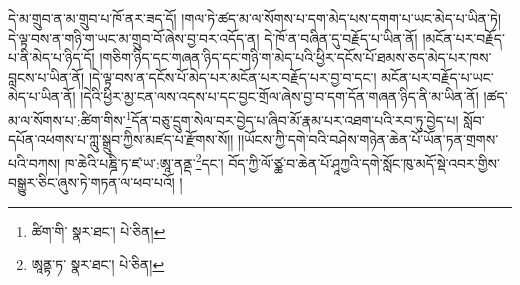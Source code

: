 དེ་མ་གྲུབ་ན་མ་གྲུབ་པ་ཁོ་ནར་ཟད་དོ། །གལ་ཏེ་ཚད་མ་ལ་སོགས་པ་དག་མེད་པས་དགག་པ་ཡང་མེད་པ་ཡིན་ཏེ། དེ་ལྟ་བས་ན་གཉི་ག་ཡང་མ་གྲུབ་བོ་ཞེས་བྱ་བར་འདོད་ན། དེ་ཁོ་ན་བཞིན་དུ་བརྗོད་པ་ཡིན་ནོ། །མངོན་པར་བརྗོད་པ་ནི་མེད་པ་ཉིད་དོ། །གཅིག་ཉིད་དང་གཞན་ཉིད་དང་གཉི་ག་མེད་པའི་ཕྱིར་དངོས་པོ་ཐམས་ཅད་མེད་པར་ཁས་བླངས་པ་ཡིན་ནོ། །དེ་ལྟ་བས་ན་དངོས་པོ་མེད་པར་མངོན་པར་བརྗོད་པར་བྱ་བ་དང་། མངོན་པར་བརྗོད་པ་ཡང་མེད་པ་ཡིན་ནོ། །དེའི་ཕྱིར་མྱ་ངན་ལས་འདས་པ་དང་བྱང་གྲོལ་ཞེས་བྱ་བ་དག་དོན་གཞན་ཉིད་ནི་མ་ཡིན་ནོ། །ཚད་མ་ལ་སོགས་པ་:ཚིག་གིས་\footnote{ཚིག་གི་  སྣར་ཐང་།  པེ་ཅིན། }དོན་བཅུ་དྲུག་སེལ་བར་བྱེད་པ་ཞིབ་མོ་རྣམ་པར་འཐག་པའི་རབ་ཏུ་བྱེད་པ། སློབ་དཔོན་འཕགས་པ་ཀླུ་སྒྲུབ་ཀྱིས་མཛད་པ་རྫོགས་སོ།། །།ཡོངས་ཀྱི་དགེ་བའི་བཤེས་གཉེན་ཆེན་པོ་ཡོན་ཏན་གྲགས་པའི་བཀས། ཁ་ཆེའི་པཎྜི་ཏ་ཛ་ཡ་:ཨཱ་ནནྡ་\footnote{ཨཱནྟ་ཏ་  སྣར་ཐང་།  པེ་ཅིན། }དང་། བོད་ཀྱི་ལོ་ཙྪ་བ་ཆེན་པོ་ཤཱཀྱའི་དགེ་སློང་ཁུ་མདོ་སྡེ་འབར་གྱིས་བསྒྱུར་ཅིང་ཞུས་ཏེ་གཏན་ལ་ཕབ་པའོ། ། 